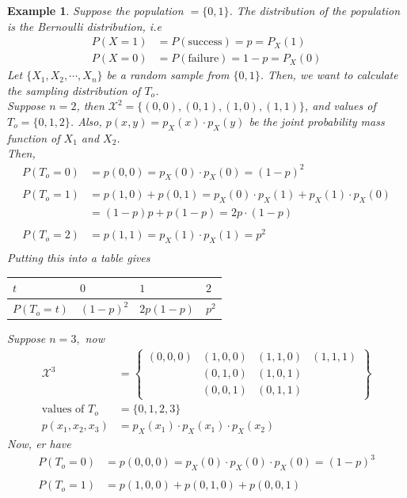 \documentclass[11pt,oneside]{book}
\theoremstyle{newStyle}
\newtheorem{ex}{Example}[section]
\newcommand{\X}{\mathcal{X}}
\begin{document}
 \begin{ex}
 Suppose the population $=\{0,1\}$. The distribution of the population is the Bernoulli distribution, i.e \begin{align*}
 P(X=1)&=P(\text{success})=p=P_X(1)\\
  P(X=0)&=P(\text{failure})=1-p=P_X(0)
 \end{align*}
 Let $\{X_1,X_2,\cdots,X_n\}$ be a random sample from $\{0,1\}$. Then, we want to calculate the sampling distribution of $T_o$.\\
 Suppose $n=2$, then $\X^2=\{(0,0),(0,1),(1,0),(1,1)\}$, and values of $T_o=\{0,1,2\}$. Also, $p(x,y)=p_X(x)\cdot p_X(y)$ be the joint probability mass function of $X_1$ and $X_2$.\\
  Then, \begin{align*}
 P(T_o=0)&=p(0,0)=p_X(0)\cdot p_X(0)=(1-p)^2\\
 \\
P(T_o=1)&=p(1,0)+p(0,1)=p_X(0)\cdot p_X(1)+p_X(1)\cdot p_X(0)\\
&=(1-p)p+p(1-p)=2p\cdot (1-p)\\
\\
 P(T_o=2)&=p(1,1)=p_X(1)\cdot p_X(1)=p^2\\
 \end{align*}
 Putting this into a table gives \begin{center}
\begin{tabular}{|l|l|l|l|}
\hline
$t$        & $0$       & $1$       & $2$   \\ \hline
$P(T_o=t)$ & $(1-p)^2$ & $2p(1-p)$ & $p^2$ \\ \hline
\end{tabular}
 \end{center}
 Suppose $n=3,$ now \begin{align*}
 \X^3&=\begin{Bmatrix}
 (0,0,0) & (1,0,0)&(1,1,0)&(1,1,1)\\
  &(0,1,0) & (1,0,1) &\\
  &(0,0,1) & (0,1,1)&
 \end{Bmatrix}\\
  \text{values of }T_o &= \{0,1,2,3\}\\
  p(x_1,x_2,x_3)&=p_X(x_1)\cdot p_X(x_1)\cdot p_X(x_2)
 \end{align*}
Now, er have \begin{align*}
P(T_o=0)&=p(0,0,0)=p_X(0)\cdot p_X(0)\cdot p_X(0)=(1-p)^3\\
\\
P(T_o=1)&=p(1,0,0)+p(0,1,0)+p(0,0,1)\\

\end{align*}
\end{ex}
\end{document}
